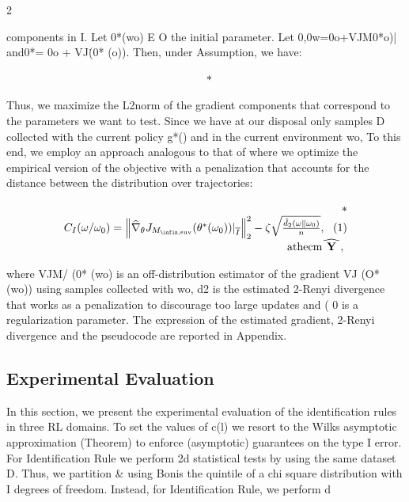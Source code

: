\documentclass{article}
\begin{document}
\sloppy

\begin{paracol}{2}
\RaggedRight

components in I. Let 0*(wo) E O the initial parameter.
Let 0,0w=0o+VJM0*o)| and0*=
0o + VJ\. (0* (o)). Then, under Assumption, we have:


\begin{equation}
\begin{array} { r l } & { * ~ }\end{array}
\end{equation}


Thus, we maximize the L2norm of the gradient components that correspond to the parameters we want to test.
Since we have at our disposal only samples D collected with
the current policy g*() and in the current environment wo,
To this end, we employ an approach analogous to that of
where we optimize the empirical version of the objective
with a penalization that accounts for the distance between
the distribution over trajectories:


\begin{equation}
\begin{array} { r } { * } \\ { C _ { I } ( \omega / \omega _ { 0 } ) = \left \| \widehat { \nabla } _ { \theta } J _ { M _ { \infin, \mathrm { s u v } } } ( \theta ^ { * } ( \omega _ { 0 } ) ) | _ { \overline { I } } \right \| _ { 2 } ^ { 2 } - \zeta \sqrt { \frac { \hat { d } _ { 2 } ( \omega \| \omega _ { 0 } ) } { n } }, ~ ~ ( 1 ) } \\ { \mathrm { a t h e c m } \widehat { \textbf { Y } }, ~ }\end{array}
\end{equation}


where VJM/ (0* (wo) is an off-distribution estimator of
the gradient VJ (O*(wo)) using samples collected with
wo, d2 is the estimated 2-Renyi divergence that works as
a penalization to discourage too large updates and (  0
is a regularization parameter. The expression of the estimated gradient, 2-Renyi divergence and the pseudocode are
reported in Appendix.


\subsection*{Experimental Evaluation}


In this section, we present the experimental evaluation of the
identification rules in three RL domains. To set the values of
c(l) we resort to the Wilks asymptotic approximation (Theorem) to enforce (asymptotic) guarantees on the type I error. For Identification Rule we perform 2d statistical tests by
using the same dataset D. Thus, we partition \& using Bonis the quintile of a chi square distribution with I degrees
of freedom. Instead, for Identification Rule, we perform d



\end{paracol}
\end{document}

